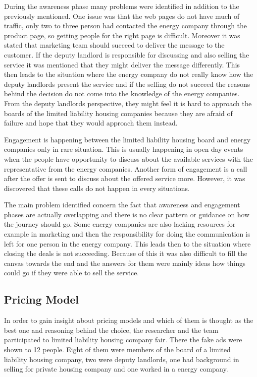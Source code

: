 During the awareness phase many problems were identified in addition to the previously mentioned. One issue was that the web pages do not have much of traffic, only two to three person had contacted the energy company through the product page, so getting people for the right page is difficult. Moreover it was stated that marketing team should succeed to deliver the message to the customer. If the deputy landlord is responsible for discussing and also selling the service it was mentioned that they might deliver the message differently. This then leads to the situation where the energy company do not really know how the deputy landlords present the service and if the selling do not succeed the reasons behind the decision do not come into the knowledge of the energy companies. From the deputy landlords perspective, they might feel it is hard to approach the boards of the limited liability housing companies because they are afraid of failure and hope that they would approach them instead. 

Engagement is happening between the limited liability housing board and energy companies only in rare situation. This is usually happening in open day events when the people have opportunity to discuss about the available services with the representative from the energy companies. Another form of engagement is a call after the offer is sent to discuss about the offered service more. However, it was discovered that these calls do not happen in every situations.

The main problem identified concern the fact that awareness and engagement phases are actually overlapping and there is no clear pattern or guidance on how the journey should go. Some energy companies are also lacking resources for example in marketing and then the responsibility for doing the communication is left for one person in the energy company. This leads then to the situation where closing the deals is not succeeding. Because of this it was also difficult to fill the canvas towards the end and the answers for them were mainly ideas how things could go if they were able to sell the service.

\subsection{Pricing Model}

In order to gain insight about pricing models and which of them is thought as the best one and reasoning behind the choice, the researcher and the team participated to limited liability housing company fair. There the fake ads were shown to 12 people. Eight of them were members of the board of a limited liability housing company, two were deputy landlords, one had background in selling for private housing company and one worked in a energy company.

